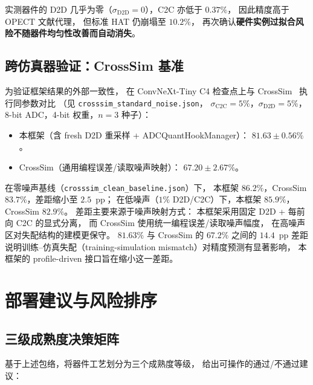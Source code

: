 实测器件的 D2D 几乎为零（$\sigma_{\mathrm{D2D}}=0$），C2C 亦低于 $0.37\%$，
因此精度高于 OPECT 文献代理，
但标准 HAT 仍崩塌至 $10.2\%$，
再次确认\textbf{硬件实例过拟合风险不随器件均匀性改善而自动消失}。

\subsection{跨仿真器验证：CrossSim 基准}

为验证框架结果的外部一致性，
在 ConvNeXt-Tiny C4 检查点上与 CrossSim~\citep{crosssim2026} 执行同参数对比
（见 \texttt{crosssim\_standard\_noise.json}，
$\sigma_{\mathrm{C2C}}=5\%$，$\sigma_{\mathrm{D2D}}=5\%$，8-bit ADC，4-bit 权重，$n=3$ 种子）：
\begin{itemize}
    \item 本框架（含 fresh D2D 重采样 + ADCQuantHookManager）：
    $\mathbf{81.63\pm0.56\%}$。
    \item CrossSim（通用编程误差/读取噪声映射）：
    $67.20\pm2.67\%$。
\end{itemize}

在零噪声基线（\texttt{crosssim\_clean\_baseline.json}）下，
本框架 $86.2\%$，CrossSim $83.7\%$，差距缩小至 $2.5$~pp；
在低噪声（$1\%$ D2D/C2C）下，本框架 $85.9\%$，CrossSim $82.9\%$。
差距主要来源于噪声映射方式：
本框架采用固定 D2D + 每前向 C2C 的显式分离，
而 CrossSim 使用统一编程误差/读取噪声幅度，
在高噪声区对失配结构的建模更保守。
$81.63\%$ 与 CrossSim 的 $67.2\%$ 之间的 $14.4$~pp 差距
说明训练--仿真失配（training-simulation mismatch）对精度预测有显著影响，
本框架的 profile-driven 接口旨在缩小这一差距。


\section{部署建议与风险排序}
\label{sec:deployment-recommendations}

\subsection{三级成熟度决策矩阵}

基于上述包络，将器件工艺划分为三个成熟度等级，
给出可操作的通过/不通过建议：

